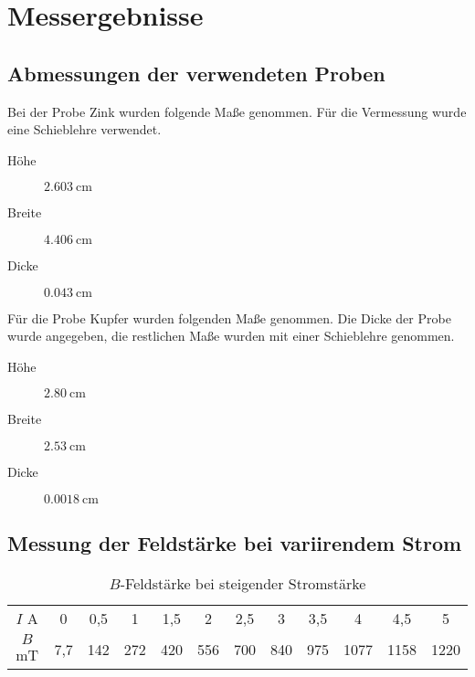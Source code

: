 \section{Messergebnisse}

\subsection{Abmessungen der verwendeten Proben}

Bei der Probe Zink wurden folgende Maße genommen.
Für die Vermessung wurde eine Schieblehre verwendet.

\begin{description}
  \item[Höhe] $\SI{2,603}{\centi\meter}$
  \item[Breite] $\SI{4,406}{\centi\meter}$
  \item[Dicke] $\SI{0,043}{\centi\meter}$
\end{description}

Für die Probe Kupfer wurden folgenden Maße genommen.
Die Dicke der Probe wurde angegeben, die restlichen Maße wurden mit einer
Schieblehre genommen.

\begin{description}
  \item[Höhe] $\SI{2,80}{\centi\meter}$
  \item[Breite] $\SI{2,53}{\centi\meter}$
  \item[Dicke] $\SI{0,0018}{\centi\meter}$
\end{description}

\subsection{Messung der Feldstärke bei variirendem Strom}

\begin{table}
 \centering
 \label{tab:Messergebnisse_Feldstärke_Isteigt}
 \begin{tabular}[width=\textwidth]{S S[table-format=1.1] S[table-format=3.1] S[table-format=3.0] S[table-format=3.1] S[table-format=3.0] S[table-format=3.1] S[table-format=3.0] S[table-format=3.1] S[table-format=4.0] S[table-format=4.1] S[table-format=4.0]}
     \toprule
     \midrule
      $I$  \si{\ampere} & 0 & 0,5 & 1 & 1,5 & 2 & 2,5 & 3 & 3,5 & 4 & 4,5 & 5 \\
      $B$  \si{\milli\tesla} & 7,7 & 142 & 272 & 420 & 556 & 700 & 840 & 975 & 1077 & 1158 & 1220 \\
      \bottomrule
\end{tabular}
  \caption{$B$-Feldstärke bei steigender Stromstärke}
\end{table}

